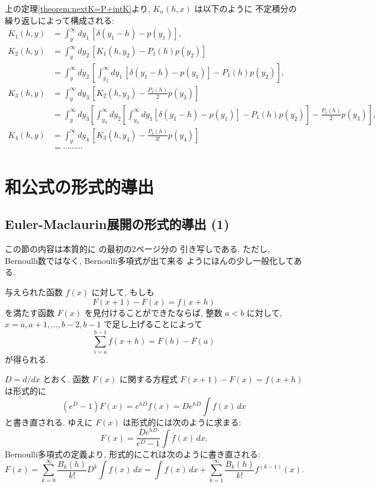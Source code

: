 \documentclass[12pt,twoside]{jarticle}
\theoremstyle{jplain}
\theoremstyle{jplain}
\theoremstyle{jplain}
\numberwithin{theorem}{section}
\numberwithin{equation}{section}
\numberwithin{figure}{section}
\numberwithin{table}{section}
\newcommand\theoremref[1]{定理\ref{#1}}
\begin{document}
上の\theoremref{theorem:nextK=P+intK}より, $K_n(h,x)$ は以下のように
不定積分の繰り返しによって構成される:
\begin{align*}
  K_1(h,y) &= \int_y^\infty dy_1\,[\delta(y_1-h)-p(y_1)],
  \\
  K_2(h,y) &= \int_y^\infty dy_2\,[K_1(h,y_2)-P_1(h)p(y_2)]
  \\
  &=\int_y^\infty dy_2\,\left[
      \int_{y_2}^\infty dy_1\,[\delta(y_1-h)-p(y_1)]-P_1(h)p(y_2)
    \right],
  \\
  K_3(h,y)
  &= \int_y^\infty dy_3\,\left[ K_2(h,y_3)-\frac{P_2(h)}{2}p(y_3) \right]
  \\
  &= \int_y^\infty \!\!dy_3 \left[
    \int_{y_3}^\infty \!\!dy_2 \left[
      \int_{y_2}^\infty \!\!dy_1 [\delta(y_1-h)-p(y_1)] - P_1(h)p(y_2)
    \right]
  -\frac{P_2(h)}{2}p(y_3) \right],
  \\
  K_4(h,y)
  &= \int_y^\infty dy_4\,\left[ K_3(h,y_4)-\frac{P_3(h)}{3!}p(y_4) \right]
  \\
  &= \cdots\cdots\cdots
\end{align*}



\section{和公式の形式的導出}
\label{sec:formal-derivation}


\subsection{Euler-Maclaurin展開の形式的導出 (1)}
\label{sec:EM(1)}

この節の内容は本質的に \cite[Chapter 25]{KC} の最初の2ページ分の
引き写しである. ただし, Bernoulli数ではなく, Bernoulli多項式が出て来る
ようにほんの少し一般化してある.

与えられた函数 $f(x)$ に対して, もしも
\[
  F(x+1)-F(x)=f(x+h)
\]
を満たす函数 $F(x)$ を見付けることができたならば,
整数 $a<b$ に対して, $x=a,a+1,\ldots,b-2,b-1$ で足し上げることによって
\[
  \sum_{i=a}^{b-1} f(x+h) = F(b) - F(a)
\]
が得られる.

$D=d/dx$ とおく. 函数 $F(x)$ に関する方程式 $F(x+1)-F(x)=f(x+h)$ は形式的に
\[
  (e^D-1)F(x)
  = e^{hD}f(x)
  = De^{hD}\int f(x)\,dx
\]
と書き直される. ゆえに $F(x)$ は形式的には次のように求まる:
\[
  F(x) = \frac{De^{hD}}{e^D-1}\int f(x)\,dx.
\]
Bernoulli多項式の定義より, 形式的にこれは次のように書き直される:
\[
  F(x)
  = \sum_{k=0}^\infty\frac{B_k(h)}{k!}D^k\int f(x)\,dx
  = \int f(x)\,dx + \sum_{k=1}^\infty \frac{B_k(h)}{k!}f^{(k-1)}(x).
\]
\end{document}
